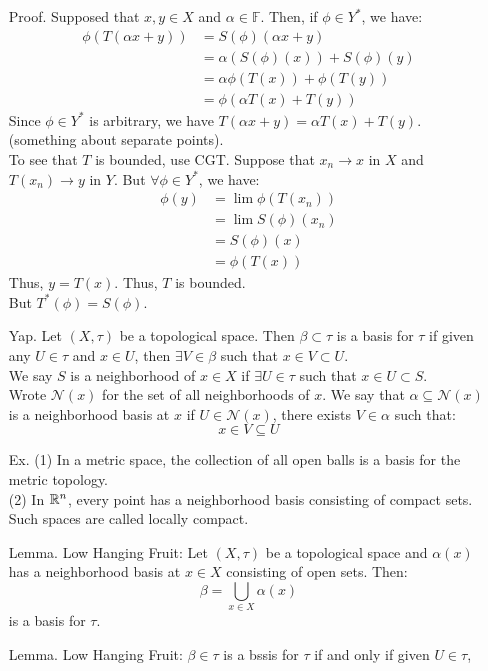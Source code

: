 \documentclass[12pt]{article}
\begin{document}
\begin{itemize}
    Proof. Supposed that $x, y \in X$ and $\alpha \in \mathbb{F}$. Then, if $\phi \in Y^*$, we have:
    \begin{align*}
        \phi(T(\alpha x + y)) &= S(\phi)(\alpha x + y) \\
        &= \alpha(S(\phi)(x)) + S(\phi)(y) \\
        &= \alpha\phi(T(x)) + \phi(T(y)) \\
        &= \phi(\alpha T(x) + T(y)) 
    \end{align*}
    Since $\phi \in Y^*$ is arbitrary, we have $T(\alpha x + y) = \alpha T(x) + T(y)$. (something about separate points). \\
    To see that $T$ is bounded, use CGT. Suppose that $x_n \to x$ in $X$ and $T(x_n) \to y$ in $Y$. But $\forall \phi \in Y^*$, we have: 
    \begin{align*}
        \phi(y) &= \lim \phi(T(x_n)) \\
        &= \lim S(\phi)(x_n) \\
        &= S(\phi)(x) \\
        &= \phi(T(x))
    \end{align*}
    Thus, $y = T(x)$. Thus, $T$ is bounded. \\
    But $T^*(\phi) = S(\phi)$. 
    \item[Yap.] Let $(X, \tau)$ be a topological space. Then $\beta \subset \tau$ is a basis for $\tau$ if given any $U \in \tau$ and $x \in U$, then $\exists V \in \beta$ such that $x \in V \subset U$. \\
    We say $S$ is a neighborhood of $x \in X$ if $\exists U \in \tau$ such that $x \in U \subset S$. \\
    Wrote $\mathcal{N}(x)$ for the set of all neighborhoods of $x$. We say that $\alpha \subseteq \mathcal{N}(x)$ is a neighborhood basis at $x$ if $U \in \mathcal{N}(x)$, there exists $V \in \alpha$ such that: 
    \[ x \in V \subseteq U \]
    \item[Ex. ] (1) In a metric space, the collection of all open balls is a basis for the metric topology. \\
    (2) In $\mathbb R^n$, every point has a neighborhood basis consisting of compact sets. Such spaces are called locally compact.
    \item[Lemma.] Low Hanging Fruit: Let $(X , \tau)$ be a topological space and $\alpha(x)$ has a neighborhood basis at $x \in X$ consisting of open sets. Then: 
    \[ \beta = \bigcup_{x \in X} \alpha(x) \]
    is a basis for $\tau$.  
    \item[Lemma.] Low Hanging Fruit: $\beta \in \tau$ is a bssis for $\tau$ if and only if given $U \in \tau$, 

\end{itemize}
\end{document}
